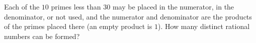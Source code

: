 Each of the $10$ primes less than $30$ may be placed in the numerator, in the denominator, or not used, and the numerator and denominator are the products of the primes placed there (an empty product is $1$). How many distinct rational numbers can be formed?

